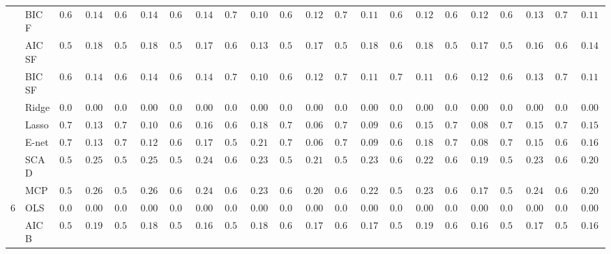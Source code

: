 \begin{tabular}{p{0.2cm}p{1cm}|p{0.6cm}p{0.6cm}|p{0.6cm}p{0.6cm}p{0.6cm}p{0.6cm}p{0.6cm}p{0.6cm}|p{0.6cm}p{0.6cm}p{0.6cm}p{0.6cm}p{0.6cm}p{0.6cm}|p{0.6cm}p{0.6cm}p{0.6cm}p{0.6cm}p{0.6cm}p{0.6cm}}
 & BIC F  & $0.666$ & $0.1423$ & $0.648$ & $0.1480$ & $0.672$ & $0.1464$ & $0.730$ & $0.1040$ & $0.696$ & $0.1286$ & $0.710$ & $0.1185$ & $0.688$ & $0.1217$ & $0.696$ & $0.1222$ & $0.692$ & $0.1346$ & $0.706$ & $0.1188$ \\
 & AIC SF  & $0.532$ & $0.1825$ & $0.554$ & $0.1839$ & $0.574$ & $0.1721$ & $0.648$ & $0.1396$ & $0.566$ & $0.1754$ & $0.588$ & $0.1860$ & $0.620$ & $0.1853$ & $0.598$ & $0.1717$ & $0.584$ & $0.1600$ & $0.662$ & $0.1469$ \\
 & BIC SF  & $0.666$ & $0.1423$ & $0.648$ & $0.1480$ & $0.676$ & $0.1415$ & $0.730$ & $0.1040$ & $0.696$ & $0.1286$ & $0.710$ & $0.1185$ & $0.700$ & $0.1155$ & $0.696$ & $0.1222$ & $0.694$ & $0.1317$ & $0.706$ & $0.1188$ \\
 & Ridge  & $0.000$ & $0.0000$ & $0.000$ & $0.0000$ & $0.000$ & $0.0000$ & $0.000$ & $0.0000$ & $0.000$ & $0.0000$ & $0.000$ & $0.0000$ & $0.000$ & $0.0000$ & $0.000$ & $0.0000$ & $0.000$ & $0.0000$ & $0.000$ & $0.0000$ \\
 & Lasso  & $0.752$ & $0.1396$ & $0.756$ & $0.1085$ & $0.666$ & $0.1683$ & $0.656$ & $0.1800$ & $0.784$ & $0.0615$ & $0.768$ & $0.0931$ & $0.670$ & $0.1567$ & $0.766$ & $0.0807$ & $0.734$ & $0.1506$ & $0.710$ & $0.1541$ \\
 & E-net  & $0.752$ & $0.1396$ & $0.746$ & $0.1201$ & $0.654$ & $0.1749$ & $0.574$ & $0.2121$ & $0.780$ & $0.0667$ & $0.766$ & $0.0987$ & $0.616$ & $0.1813$ & $0.764$ & $0.0871$ & $0.728$ & $0.1544$ & $0.684$ & $0.1686$ \\
 & SCAD  & $0.540$ & $0.2535$ & $0.548$ & $0.2584$ & $0.536$ & $0.2460$ & $0.634$ & $0.2345$ & $0.590$ & $0.2153$ & $0.576$ & $0.2332$ & $0.602$ & $0.2265$ & $0.608$ & $0.1968$ & $0.536$ & $0.2393$ & $0.644$ & $0.2022$ \\
 & MCP  & $0.590$ & $0.2627$ & $0.580$ & $0.2629$ & $0.610$ & $0.2468$ & $0.626$ & $0.2321$ & $0.656$ & $0.2071$ & $0.642$ & $0.2226$ & $0.594$ & $0.2317$ & $0.664$ & $0.1795$ & $0.598$ & $0.2486$ & $0.662$ & $0.2004$ \\\hline
6 & OLS  & $0.000$ & $0.0000$ & $0.000$ & $0.0000$ & $0.000$ & $0.0000$ & $0.000$ & $0.0000$ & $0.000$ & $0.0000$ & $0.000$ & $0.0000$ & $0.000$ & $0.0000$ & $0.000$ & $0.0000$ & $0.000$ & $0.0000$ & $0.000$ & $0.0000$ \\
 & AIC B  & $0.594$ & $0.1979$ & $0.578$ & $0.1883$ & $0.590$ & $0.1691$ & $0.590$ & $0.1829$ & $0.612$ & $0.1725$ & $0.634$ & $0.1799$ & $0.570$ & $0.1936$ & $0.644$ & $0.1623$ & $0.584$ & $0.1791$ & $0.590$ & $0.1617$ \\

\end{tabular}
